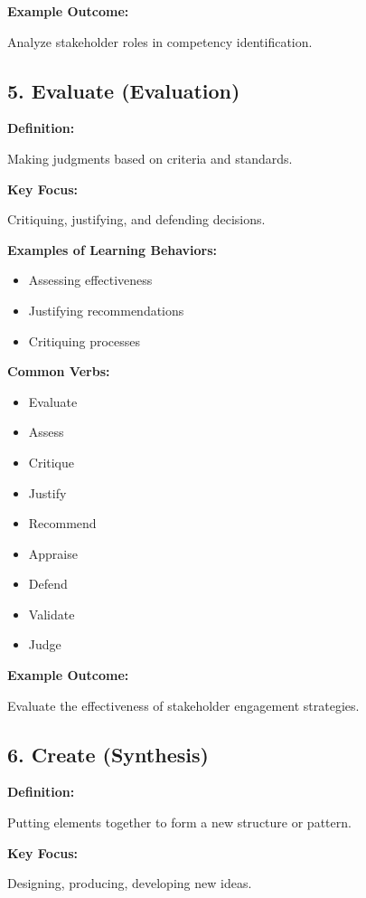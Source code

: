 \documentclass[12pt]{article}
\begin{document}
\textbf{Example Outcome:}

Analyze stakeholder roles in competency identification.

\subsection{5. Evaluate (Evaluation)}

\textbf{Definition:}

Making judgments based on criteria and standards.

\textbf{Key Focus:}

Critiquing, justifying, and defending decisions.

\textbf{Examples of Learning Behaviors:}

\begin{itemize}
    \item Assessing effectiveness
    \item Justifying recommendations
    \item Critiquing processes
\end{itemize}

\textbf{Common Verbs:}

\begin{itemize}
    \item Evaluate
    \item Assess
    \item Critique
    \item Justify
    \item Recommend
    \item Appraise
    \item Defend
    \item Validate
    \item Judge
\end{itemize}

\textbf{Example Outcome:}

Evaluate the effectiveness of stakeholder engagement strategies.

\subsection{6. Create (Synthesis)}

\textbf{Definition:}

Putting elements together to form a new structure or pattern.

\textbf{Key Focus:}

Designing, producing, developing new ideas.
\end{document}
